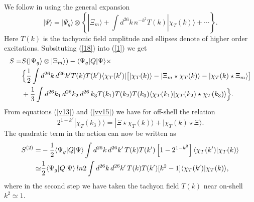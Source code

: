 \documentclass[a4paper,12pt]{article}
\begin{document}
We follow \cite{rsz1} in using the general expansion
\begin{equation}
|\Psi\rangle=|\Psi_g\rangle\otimes\left\{
|\Xi_m\rangle +\int d^{26}k \, n^{-k^2}T(k)|\chi_T(k)\rangle+\cdots
\right\} .
\label{18}
\end{equation}
Here $T(k)$ is the tachyonic field amplitude and ellipses denote of
higher order excitations. Subsituting (\ref{18}) into (\ref{1}) we get
\cite{rsz1}
\begin{align}
S=& S(|\Psi_g\rangle\otimes|\Xi_m\rangle)-\langle\Psi_g|Q|\Psi\rangle
\times \notag \\
& \Bigl\{
\frac 12\int d^{26}k\, d^{26}{k'}T(k)T(k')
\langle\chi_T(k')|
\bigl[|\chi_T(k)\rangle
-|\Xi_m\star\chi_T(k)\rangle
-|\chi_T(k)\star\Xi_m\rangle
\bigr]
  \notag \\
& +\frac 13\int d^{26} k_1\,d^{26} k_2\,d^{26}\, k_3T(k_1)T(k_2)T(k_3)
\langle\chi_T(k_1)|\chi_T(k_2)\star\chi_T(k_3)\rangle
\Bigr\} .
\label{19}
\end{align}
From equations (\ref{v13}) and (\ref{vv15}) we have for off-shell the relation
\begin{equation}
2^{1-k^2}|\chi_T(k_3)\rangle=|\Xi\star\chi_T(k)\rangle+ 
|\chi_T(k)\star\Xi\rangle .
\label{20}
\end{equation}
The quadratic term in the action can now be written as
\begin{align}
S^{(2)}=&-\frac 12\langle\Psi_g|Q|\Psi\rangle
\int d^{26}k \, d^{26}k' \, T(k)T(k')
\left[1-2^{1-k^2}\right]
\langle\chi_T(k')|\chi_T(k)\rangle
 \notag \\
\simeq &\frac 12\langle\Psi_g|Q|\Psi\rangle\, ln2
\int d^{26}k\, d^{26}k' \, T(k)T(k')[k^2-1]
\langle\chi_T(k')|\chi_T(k)\rangle ,
\label{21}
\end{align}
where in the second step we have taken the tachyon field $T(k)$
near on-shell $k^2\simeq 1$.
\end{document}
